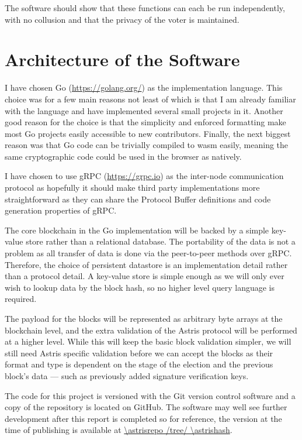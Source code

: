 The software should show that these functions can each be run independently, with no collusion and that the privacy of the voter is maintained.

\section{Architecture of the Software}
\label{ch:sw:architecture}

I have chosen Go (\url{https://golang.org/}) as the implementation language. This choice was for a few main reasons not least of which is that I am already familiar with the language and have implemented several small projects in it. Another good reason for the choice is that the simplicity and enforced formatting make most Go projects easily accessible to new contributors. Finally, the next biggest reason was that Go code can be trivially compiled to \gls{wasm} easily, meaning the same cryptographic code could be used in the browser as natively.

I have chosen to use gRPC (\url{https://grpc.io}) as the inter-node communication protocol as hopefully it should make third party implementations more straightforward as they can share the Protocol Buffer definitions and code generation properties of gRPC.

The core blockchain in the Go implementation will be backed by a simple key-value store rather than a relational database. The portability of the data is not a problem as all transfer of data is done via the peer-to-peer methods over gRPC. Therefore, the choice of persistent datastore is an implementation detail rather than a protocol detail. A key-value store is simple enough as we will only ever wish to lookup data by the block hash, so no higher level query language is required.

The payload for the blocks will be represented as arbitrary byte arrays at the blockchain level, and the extra validation of the Astris protocol will be performed at a higher level. While this will keep the basic block validation simpler, we will still need Astris specific validation before we can accept the blocks as their format and type is dependent on the stage of the election and the previous block's data --- such as previously added signature verification keys.

The code for this project is versioned with the Git version control software and a copy of the repository is located on GitHub. The software may well see further development after this report is completed so for reference, the version at the time of publishing is available at \url{\astrisrepo /tree/ \astrishash}.

